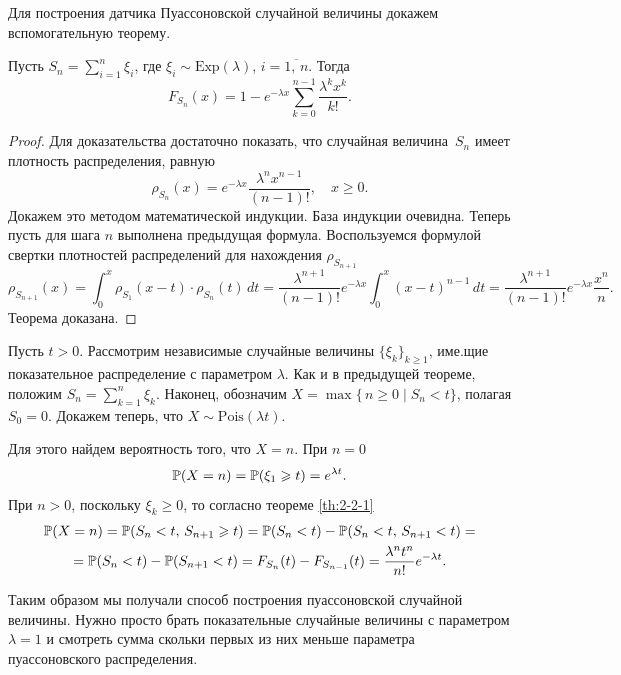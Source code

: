 Для построения датчика Пуассоновской случайной величины докажем вспомогательную теорему.
\begin{theorem}
\label{th:2-2-1}
        Пусть $S_n = \sum_{i=1}^n \xi_i$, где $\xi_i\sim\mbox{Exp}(\lambda)$, $i = \overline{1,\,n}$.
        Тогда
$$
        F_{S_n}(x) = 1 - e^{-\lambda x}\sum_{k = 0}^{n-1} \frac{\lambda^k x^k}{k!}.
$$
\end{theorem}
\begin{proof}
        Для доказательства достаточно показать, что случайная величина~$S_n$ имеет плотность распределения, равную
$$
        \rho_{S_n}(x) = e^{-\lambda x}\frac{\lambda^{n}x^{n-1}}{(n-1)!},\quad x\geqslant 0.
$$
Докажем это методом математической индукции.
База индукции очевидна.
Теперь пусть для шага $n$ выполнена предыдущая формула.
Воспользуемся формулой свертки плотностей распределений для нахождения $\rho_{S_{n+1}}$
$$
        \rho_{S_{n+1}}(x)
        =
        \int_0^x \rho_{S_1}(x - t)\cdot\rho_{S_n}(t)\,dt
        =
        \frac{\lambda^{n+1}}{(n-1)!}e^{-\lambda x}\int_0^x (x-t)^{n-1}\,dt
        =
        \frac{\lambda^{n+1}}{(n-1)!} e^{-\lambda x}\frac{x^n}{n}.
$$
Теорема доказана.

\end{proof}

Пусть $t > 0$. Рассмотрим независимые случайные величины $\{\xi_k\}_{k \geqslant 1}$, име.щие показательное распределение с параметром $\lambda$. Как и в предыдущей теореме, положим $S_n = \sum_{k=1}^n \xi_k$. Наконец, обозначим $X = \max\{\,n\geqslant 0\;|\;S_n < t\}$, полагая $S_0 = 0$. Докажем теперь, что $X\sim\mbox{Pois}(\lambda t)$.

Для этого найдем вероятность того, что $X = n$. При $n = 0$
$$
        \mathbb{P} (X = n) = \mathbb{P} (\xi_1 \geqslant t) = e^{\lambda t}.
$$
При $n > 0$, поскольку $\xi_k \geqslant 0$, то согласно теореме \ref{th:2-2-1}
\begin{multline*}
        \mathbb{P} (X = n) 
        =
        \mathbb{P} (S_n < t,\, S_{n+1} \geqslant t)
        =
        \mathbb{P}(S_n < t) - \mathbb{P}(S_n < t,\,S_{n+1} < t)
        = \\ =
        \mathbb{P}(S_n < t) - \mathbb{P}(S_{n+1} < t)
        =
        F_{S_n}(t) - F_{S_{n-1}}(t)
        =
        \frac{\lambda^n t^n}{n!}e^{-\lambda t}.
\end{multline*}

Таким образом мы получали способ построения пуассоновской случайной величины. Нужно просто брать показательные случайные величины с параметром $\lambda = 1$ и смотреть сумма скольки первых из них меньше параметра пуассоновского распределения.

